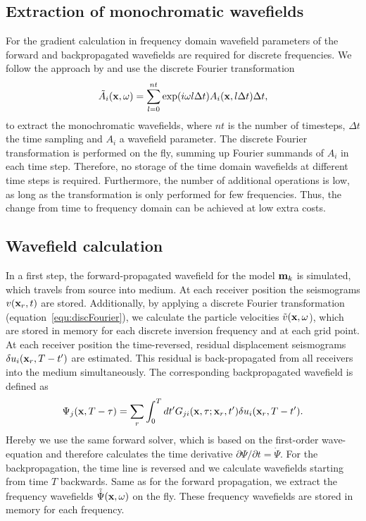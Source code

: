 \subsection{Extraction of monochromatic wavefields}
For the gradient calculation in frequency domain wavefield parameters of the forward and backpropagated wavefields are required for discrete frequencies. We follow the approach by \cite{Sir08} and use the discrete Fourier transformation
\begin{equation}\tilde{A}_i(\textbf x,\omega)=\sum_{l=0}^{nt}\exp(i\omega l\Delta t)A_i(\textbf x,l\Delta t)\Delta t, \label{equ:discFourier}  \end{equation}
 to extract the monochromatic wavefields, where $nt$ is the number of timesteps, $\Delta t$ the time sampling and $A_i$ a wavefield parameter. The discrete Fourier transformation is performed on the fly, summing up Fourier summands of $A_i$ in each time step. Therefore, no storage of the time domain wavefields at different time steps is required. Furthermore, the number of additional operations is low, as long as the transformation is only performed for few frequencies. Thus, the change from time to frequency domain can be achieved at low extra costs.
\subsection{Wavefield calculation}
In a first step, the forward-propagated wavefield for the model $\textbf m_k$ is simulated, which travels from source into medium. At each receiver position the seismograms $v(\textbf x_r,t)$ are stored. Additionally, by applying a discrete Fourier transformation (equation~\ref{equ:discFourier}), we calculate the particle velocities $\tilde v(\textbf x,\omega$), which are stored in memory for each discrete inversion frequency and at each grid point.\\
At each receiver position the time-reversed, residual displacement seismograms  $\delta u_i(\textbf x_r,T-t')$ are estimated. This residual is back-propagated from all receivers into the medium simultaneously. The corresponding backpropagated wavefield is defined as \begin{equation} \Psi_j(\textbf x,T-\tau)=\sum_{r}\int_0^T dt' G_{ji}(\textbf x,\tau;\textbf x_r,t')\delta u_i(\textbf x_r,T-t').\label{equ:psi}\end{equation} 
Hereby we use the same forward solver, which is based on the first-order wave-equation and therefore calculates the time derivative $\partial\Psi/\partial t=\dot\Psi$. For the backpropagation, the time line is reversed and we calculate wavefields starting from time $T$ backwards. Same as for the forward propagation, we extract the frequency wavefields $\tilde{\dot\Psi}(\textbf x,\omega)$ on the fly. These frequency wavefields are stored in memory for each frequency.

